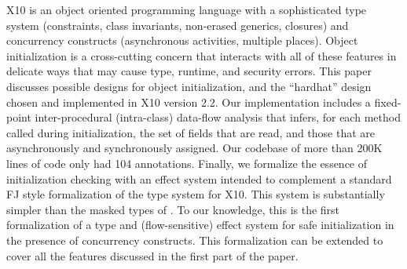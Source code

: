 X10 is an object oriented programming language with a sophisticated
    type system (constraints, class invariants, non-erased generics, closures)
    and concurrency constructs (asynchronous activities, multiple places).
Object initialization is a cross-cutting concern that interacts with all of these features
    in delicate ways that may cause type, runtime, and security errors.
This paper discusses possible designs for object initialization,
    and the ``hardhat'' design chosen and implemented in X10 version 2.2.
Our implementation includes a
    fixed-point inter-procedural (intra-class)
    data-flow analysis
    that infers, for each method called during initialization,
    the set of fields that are read, and
    those that are asynchronously and synchronously assigned.
Our codebase of more than 200K lines of code only had 104 annotations.
Finally, we formalize the essence of initialization checking with an
effect system intended to complement a standard FJ style
formalization of the type system for X10. This system is substantially
simpler than the masked types of \cite{XinQi:2009}. To our knowledge, this is
the first formalization of a type and (flow-sensitive) effect system
for safe initialization in the presence of concurrency
constructs. This formalization can be extended to cover all the
features discussed in the first part of the paper.
